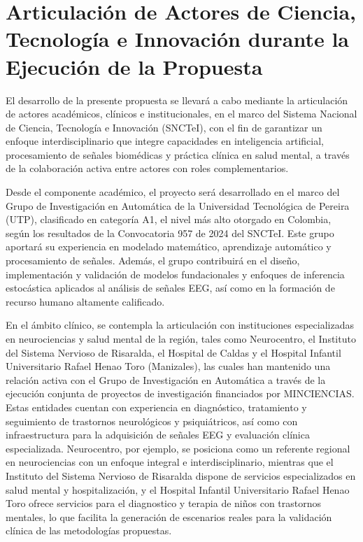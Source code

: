 \section{Articulación de Actores de Ciencia, Tecnología e Innovación durante la Ejecución de la Propuesta}

El desarrollo de la presente propuesta se llevará a cabo mediante la articulación de actores académicos, clínicos e institucionales, en el marco del Sistema Nacional de Ciencia, Tecnología e Innovación (SNCTeI), con el fin de garantizar un enfoque interdisciplinario que integre capacidades en inteligencia artificial, procesamiento de señales biomédicas y práctica clínica en salud mental, a través de la colaboración activa entre actores con roles complementarios.

Desde el componente académico, el proyecto será desarrollado en el marco del Grupo de Investigación en Automática de la Universidad Tecnológica de Pereira (UTP), clasificado en categoría A1, el nivel más alto otorgado en Colombia, según los resultados de la Convocatoria 957 de 2024 del SNCTeI. Este grupo aportará su experiencia en modelado matemático, aprendizaje automático y procesamiento de señales. Además, el grupo contribuirá en el diseño, implementación y validación de modelos fundacionales y enfoques de inferencia estocástica aplicados al análisis de señales EEG, así como en la formación de recurso humano altamente calificado.

En el ámbito clínico, se contempla la articulación con instituciones especializadas en neurociencias y salud mental de la región, tales como Neurocentro, el Instituto del Sistema Nervioso de Risaralda, el Hospital de Caldas y el Hospital Infantil Universitario Rafael Henao Toro (Manizales), las cuales han mantenido una relación activa con el Grupo de Investigación en Automática a través de la ejecución conjunta de proyectos de investigación financiados por MINCIENCIAS. Estas entidades cuentan con experiencia en diagnóstico, tratamiento y seguimiento de trastornos neurológicos y psiquiátricos, así como con infraestructura para la adquisición de señales EEG y evaluación clínica especializada. Neurocentro, por ejemplo, se posiciona como un referente regional en neurociencias con un enfoque integral e interdisciplinario, mientras que el Instituto del Sistema Nervioso de Risaralda dispone de servicios especializados en salud mental y hospitalización, y el Hospital Infantil Universitario Rafael Henao Toro ofrece servicios para el diagnostico y terapia de niños con trastornos mentales, lo que facilita la generación de escenarios reales para la validación clínica de las metodologías propuestas.


